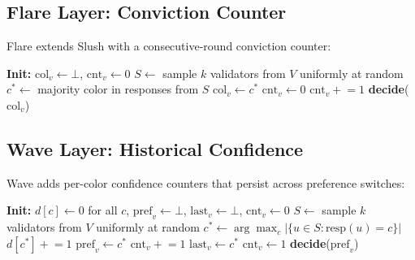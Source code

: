 \documentclass[11pt,a4paper]{article}
\begin{document}
\subsection{Flare Layer: Conviction Counter}

Flare extends Slush with a consecutive-round conviction counter:

\begin{algorithm}
\caption{Flare: Conviction-Based Finalization}
\label{alg:flare}
\begin{algorithmic}[1]
\State \textbf{Init:} $\text{col}_v \leftarrow \bot$, $\text{cnt}_v \leftarrow 0$
        \State $S \leftarrow$ sample $k$ validators from $V$ uniformly at random
        \State $c^* \leftarrow$ majority color in responses from $S$
                \State $\text{col}_v \leftarrow c^*$
                \State $\text{cnt}_v \leftarrow 0$ 
            \EndIf
            \State $\text{cnt}_v \mathrel{+}= 1$
        \EndIf
    \EndWhile
    \State \textbf{decide}($\text{col}_v$)
\EndProcedure
\end{algorithmic}
\end{algorithm}

\subsection{Wave Layer: Historical Confidence}

Wave adds per-color confidence counters that persist across preference switches:

\begin{algorithm}
\caption{Wave: Persistent Confidence Counters}
\label{alg:wave}
\begin{algorithmic}[1]
\State \textbf{Init:} $d[c] \leftarrow 0$ for all $c$, $\text{pref}_v \leftarrow \bot$, $\text{last}_v \leftarrow \bot$, $\text{cnt}_v \leftarrow 0$
        \State $S \leftarrow$ sample $k$ validators from $V$ uniformly at random
        \State $c^* \leftarrow \arg\max_c |\{u \in S : \text{resp}(u) = c\}|$
            \State $d[c^*] \mathrel{+}= 1$
                \State $\text{pref}_v \leftarrow c^*$ 
            \EndIf
                \State $\text{cnt}_v \mathrel{+}= 1$
            \Else
                \State $\text{last}_v \leftarrow c^*$
                \State $\text{cnt}_v \leftarrow 1$
            \EndIf
        \EndIf
    \EndWhile
    \State \textbf{decide}($\text{pref}_v$)
\EndProcedure
\end{algorithmic}
\end{algorithm}
\end{document}
